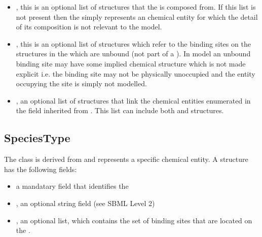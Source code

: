 \documentclass{cekarticle}
\begin{document}
\begin{itemize}

\item {}, this is an optional list of 
structures that the  is composed from.  If this list is not present
then the  simply represents an chemical entity for which the detail
of its composition is not relevant to the model.

\item {}, this is an optional list of  structures which
refer to the binding sites on the  structures in the 
which are unbound (not part of a ).  In model an unbound binding site may have
some implied chemical structure which is not made explicit i.e. the binding site may not be physically
unoccupied and the entity occupying the site is simply not modelled.

\item {}, an optional list of  structures that link the chemical entities 
enumerated in the  field inherited from .
This list can include both  and  structures.

\end{itemize}

\subsection{SpeciesType}

The class  is derived from  and represents a specific
chemical entity.  A  structure has the following fields:

\begin{itemize}

\item {} a mandatary  field that identifies the 

\item {}, an optional string field (see SBML Level 2)

\item {}, an optional  list, which contains the set of binding
sites that are located on the .

\end{itemize} 
\end{document}
